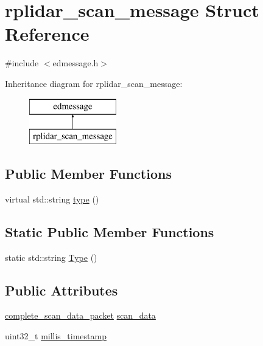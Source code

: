 \hypertarget{structrplidar__scan__message}{\section{rplidar\-\_\-scan\-\_\-message Struct Reference}
\label{structrplidar__scan__message}
}


{\ttfamily \#include $<$edmessage.\-h$>$}

Inheritance diagram for rplidar\-\_\-scan\-\_\-message\-:\begin{figure}[H]
\begin{center}
\leavevmode
\includegraphics[height=2.000000cm]{structrplidar__scan__message}
\end{center}
\end{figure}
\subsection*{Public Member Functions}
\begin{DoxyCompactItemize}
\item 
virtual std\-::string \hyperlink{structrplidar__scan__message_aa402778fbabf5375a2a9f229bdb609b6}{type} ()
\end{DoxyCompactItemize}
\subsection*{Static Public Member Functions}
\begin{DoxyCompactItemize}
\item 
static std\-::string \hyperlink{structrplidar__scan__message_a9df9e3d712a557d2f4abc3c90c5907b7}{Type} ()
\end{DoxyCompactItemize}
\subsection*{Public Attributes}
\begin{DoxyCompactItemize}
\item 
\hyperlink{structcomplete__scan__data__packet}{complete\-\_\-scan\-\_\-data\-\_\-packet} \hyperlink{structrplidar__scan__message_a93aed58534e2f3b8263c3a27e4b1f511}{scan\-\_\-data}
\item 
uint32\-\_\-t \hyperlink{structrplidar__scan__message_a8a3d08350e35f717ef463ee0ee6f6952}{millis\-\_\-timestamp}
\end{DoxyCompactItemize}



